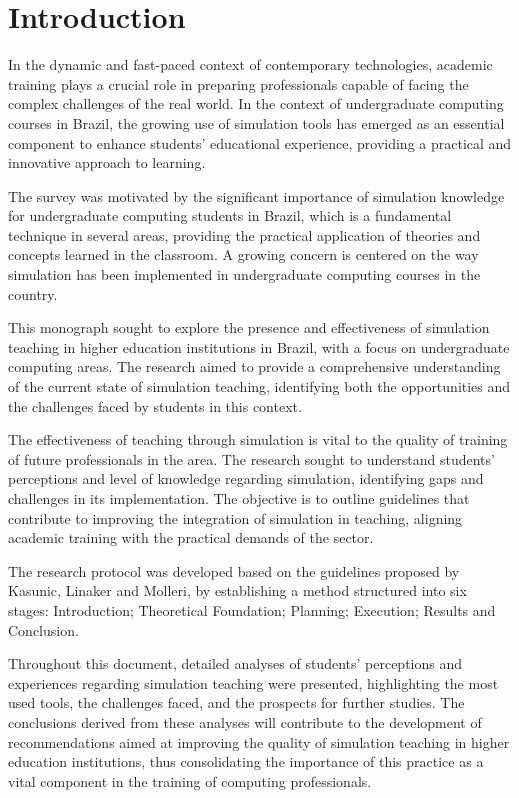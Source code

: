 \section{Introduction}
\label{sec:introduction}

In the dynamic and fast-paced context of contemporary technologies, academic training plays a crucial role in preparing professionals capable of facing the complex challenges of the real world. In the context of undergraduate computing courses in Brazil, the growing use of simulation tools has emerged as an essential component to enhance students' educational experience, providing a practical and innovative approach to learning.

The survey was motivated by the significant importance of simulation knowledge for undergraduate computing students in Brazil, which is a fundamental technique in several areas, providing the practical application of theories and concepts learned in the classroom. A growing concern is centered on the way simulation has been implemented in undergraduate computing courses in the country.

This monograph sought to explore the presence and effectiveness of simulation teaching in higher education institutions in Brazil, with a focus on undergraduate computing areas. The research aimed to provide a comprehensive understanding of the current state of simulation teaching, identifying both the opportunities and the challenges faced by students in this context.

The effectiveness of teaching through simulation is vital to the quality of training of future professionals in the area. The research sought to understand students' perceptions and level of knowledge regarding simulation, identifying gaps and challenges in its implementation. The objective is to outline guidelines that contribute to improving the integration of simulation in teaching, aligning academic training with the practical demands of the sector.

The research protocol was developed based on the guidelines proposed by \cite{kasunic:survey} Kasunic, \cite{Linaker:survey:guideline} Linaker and \cite{Molleri:2016:SGS:2961111.2962619} Molleri, by establishing a method structured into six stages: Introduction; Theoretical Foundation; Planning; Execution; Results and Conclusion.

Throughout this document, detailed analyses of students' perceptions and experiences regarding simulation teaching were presented, highlighting the most used tools, the challenges faced, and the prospects for further studies. The conclusions derived from these analyses will contribute to the development of recommendations aimed at improving the quality of simulation teaching in higher education institutions, thus consolidating the importance of this practice as a vital component in the training of computing professionals.

